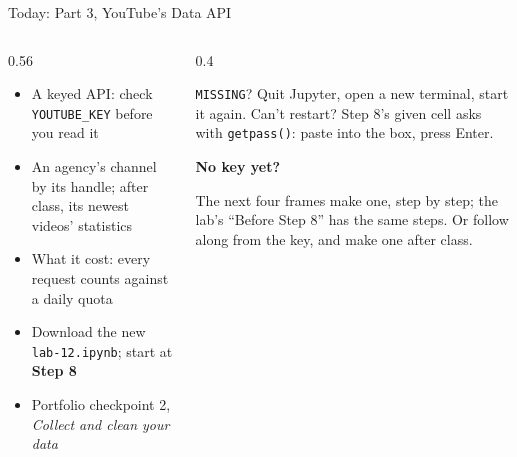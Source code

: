 \documentclass[9pt,aspectratio=169]{beamer}
\begin{document}
\begin{frame}{Today: Part 3, YouTube's Data API}
    \begin{columns}[T]
        \begin{column}{0.56\textwidth}
            \begin{itemize}\small
                \item A keyed API: check \texttt{YOUTUBE\_KEY} before you read it
                \item An agency's channel by its handle; after class, its newest videos' statistics
                \item What it cost: every request counts against a daily quota
                \item Download the new \texttt{lab-12.ipynb}; start at \textbf{Step 8}
            \end{itemize}

            \medskip
            \begin{itemize}\small
                \item Portfolio checkpoint 2, \textit{Collect and clean your data}
            \end{itemize}
        \end{column}
        \begin{column}{0.4\textwidth}
            \begin{alertblock}{\texttt{MISSING}?}
                \footnotesize Quit Jupyter, open a new terminal, start it again. Can't restart? Step 8's given cell asks with \texttt{getpass()}: paste into the box, press Enter.
            \end{alertblock}
            \textbf{No key yet?}\\[2pt]
            {\footnotesize The next four frames make one, step by step; the lab's ``Before Step 8'' has the same steps. Or follow along from the key, and make one after class.\par}
        \end{column}
    \end{columns}
\end{frame}
\end{document}
